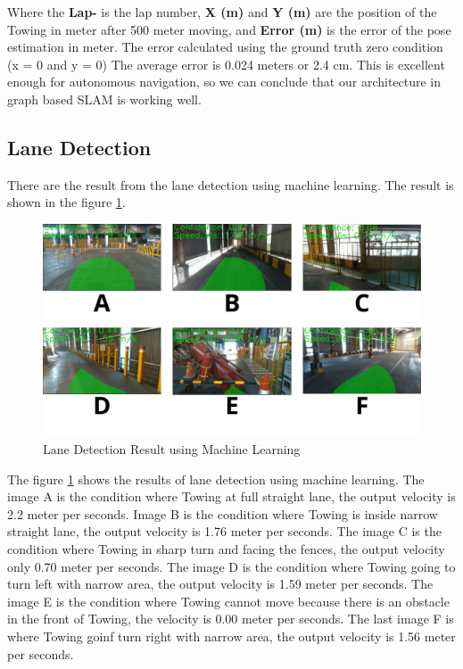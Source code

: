 \documentclass[conference]{IEEEtran}
\begin{document}
Where the \textbf{Lap-} is the lap number, \textbf{X (m)} and \textbf{Y (m)} are the position of the Towing in meter after 500 meter moving, and \textbf{Error (m)} is the error of the pose estimation in meter. The error calculated using the ground truth zero condition (x = 0 and y = 0) The average error is 0.024 meters or 2.4 cm. This is excellent enough for autonomous navigation, so we can conclude that our architecture in graph based SLAM is working well.

\subsection{Lane Detection}
There are the result from the lane detection using machine learning. The result is shown in the figure \ref{fig:lane_detection_result}.
\begin{figure}[H]
	\centering
	\includegraphics[width=\linewidth]{../konten/bnr_satu.png}
	\caption{Lane Detection Result using Machine Learning}
	\label{fig:lane_detection_result}
\end{figure}
The figure \ref{fig:lane_detection_result} shows the results of lane detection using machine learning. The image A is the condition where Towing at full straight lane, the output velocity is 2.2 meter per seconds. Image B is the condition where Towing is inside narrow straight lane, the output velocity is 1.76 meter per seconds. The image C is the condition where Towing in sharp turn and facing the fences, the output velocity only 0.70 meter per seconds. The image D is the condition where Towing going to turn left with narrow area, the output velocity is 1.59 meter per seconds. The image E is the condition where Towing cannot move because there is an obstacle in the front of Towing, the velocity is 0.00 meter per seconds. The last image F is where Towing goinf turn right with narrow area, the output velocity is 1.56 meter per seconds. 
\end{document}
